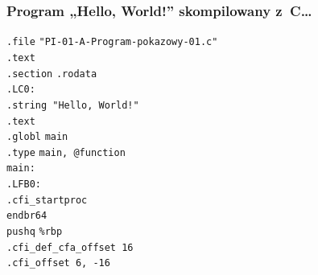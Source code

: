 \documentclass[10pt,t]{beamer}
\begin{document}
\begin{frame}
  \frametitle{Program „Hello, World!” skompilowany z~C\ldots}


  \hphantom{aaaaa} \texttt{.file} \hphantom{aaa}
  \texttt{"PI-01-A-Program-pokazowy-01.c"} \\
  \hphantom{aaaaa} \texttt{.text} \\
  \hphantom{aaaaa} \texttt{.section} \hphantom{aaaaaa} \texttt{.rodata} \\
  \texttt{.LC0:} \\
  \hphantom{aaaaa} \texttt{.string "Hello, World!"} \\
  \hphantom{aaaaa} \texttt{.text} \\
  \hphantom{aaaaa} \texttt{.globl} \hphantom{aa} \texttt{main} \\
  \hphantom{aaaaa} \texttt{.type} \hphantom{aaa}
  \texttt{main, @function} \\
  \texttt{main:} \\
  \texttt{.LFB0:} \\
  \hphantom{aaaaa} \texttt{.cfi\_startproc} \\
  \hphantom{aaaaa} \texttt{endbr64} \\
  \hphantom{aaaaa} \texttt{pushq} \hphantom{aaa} \texttt{\%rbp} \\
  \hphantom{aaaaa} \texttt{.cfi\_def\_cfa\_offset 16} \\
  \hphantom{aaaaa} \texttt{.cfi\_offset 6, -16} \\

\end{frame}
\end{document}
